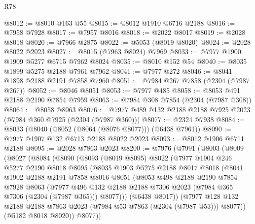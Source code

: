 \begin{lexlean}{R78}
\begin{coremodule}
@8012 := @8010 @163 @55
@8015 := @8012 @1910 @6716 @2188
@8016 := @7958 @7928
@8017 := @7957 @8016
@8018 := @2022 @8017
@8019 := @2028 @8018
@8020 := @7966 @2875
@8022 := @5053 (@8019 @8020)
@8024 := @2028 @8022 @2023
@8027 := @8015 (@7963 @8024) @7969
@8033 := @7977 @1900 @1909 @5277 @6715 @7962 @8024
@8035 := @8010 @152 @54
@8040 := @8035 @1899 @5275 @2188 @7961 @7962
@8041 := @7977 @272
@8046 := @8041 @1898 @2188 @2191 @7858 @7960
@8051 := @7984 @267 @7858 (@2304 (@7987 @267))
@8052 := @8046 @8051
@8053 := @7977 @485
@8058 := @8053 @491 @2188 @2190 @7854 @7959
@8063 := @7984 @308 @7854 (@2304 (@7987 @308))
@8064 := @8058 @8063
@8076 := @7977 @489 @132 @2188 @2188 @7925 @2023 (@7984 @360 @7925 (@2304 (@7987 @360)))
@8077 := @2324 @7938
@8084 := @8033 (@8040 (@8052 (@8064 (@8076 @8077))) (@6438 @7961))
@8090 := @7977 @1907 @132 @6713 @2188 @8022 @2023
@8093 := @8012 @1906 @6711 @2188
@8095 := @2028 @7863 @2023
@8200 := @7976
    (@7991
      (@8003
        (@8009
          (@8027
            (@8084
              (@8090
                (@8093
                  (@8019 @8095)
                  @8022
                  (@7977
                    @1904
                    @246
                    @5277
                    @2190
                    @8018
                    @8095
                    (@8035
                      @1903
                      @5275
                      @2188
                      @8017
                      @8018
                      (@8041
                        @1902
                        @2188
                        @2191
                        @7858
                        @8016
                        @8051
                        (@8053
                          @498
                          @2188
                          @2190
                          @7854
                          @7928
                          @8063
                          (@7977
                            @496
                            @132
                            @2188
                            @2188
                            @7306
                            @2023
                            (@7984 @365 @7306 (@2304 (@7987 @365)))
                            @8077)))
                      (@6438 @8017))
                    (@7977
                      @128
                      @132
                      @2188
                      @2188
                      @7863
                      @2023
                      (@7984 @53 @7863 (@2304 (@7987 @53)))
                      @8077))
                  (@5182 @8018 @8020))
                @8077))

\end{coremodule}
\end{lexlean}
